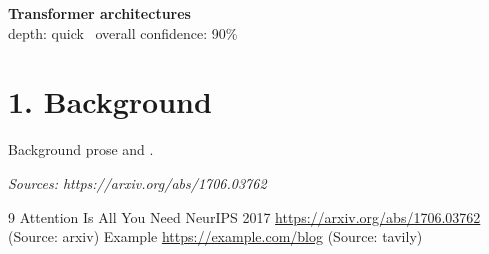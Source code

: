 \documentclass[11pt]{article}
\begin{document}
\begin{center}
{\LARGE\bfseries Transformer architectures}\\[0.8em]
{\small depth: quick \textperiodcentered\ overall confidence: 90\%}
\end{center}

\section*{1. Background}

Background prose \cite{vaswani2017attention} and \cite{example}.

\noindent\textit{Sources: https://arxiv.org/abs/1706.03762}

\begin{thebibliography}{9}
 Attention Is All You Need NeurIPS 2017 \url{https://arxiv.org/abs/1706.03762} (Source: arxiv)
 Example \url{https://example.com/blog} (Source: tavily)
\end{thebibliography}
\end{document}
